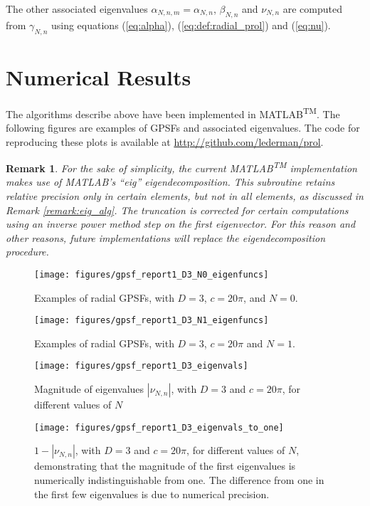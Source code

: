 \documentclass[12pt]{article}
\newtheorem{remark}{Remark}
\begin{document}
The other associated eigenvalues  $\alpha_{N,n,m} = \alpha_{N,n}$, $\beta_{N,n}$ and 
$\nu_{N,n}$ are computed from $\gamma_{N,n}$ using equations (\ref{eq:alpha}), (\ref{eq:def:radial_prol}) and (\ref{eq:nu}).


\section{Numerical Results}\label{sec:results}

The algorithms describe above have been implemented in MATLAB\textsuperscript{TM}.
The following figures are examples of GPSFs and associated eigenvalues. 
The code for reproducing these plots is available at \url{http://github.com/lederman/prol}.

\begin{remark}
For the sake of simplicity, the current MATLAB\textsuperscript{TM} implementation makes use of MATLAB's ``eig'' eigendecomposition.
This subroutine retains relative precision only in certain elements, but not in all elements, as discussed in Remark \ref{remark:eig_alg}.
The truncation is corrected for certain computations using an inverse power method step on the first eigenvector. 
For this reason and other reasons, future implementations will replace the eigendecomposition procedure. 
\end{remark}


\begin{figure}[h]
\texttt{[image: figures/gpsf\_report1\_D3\_N0\_eigenfuncs]}
\caption{Examples of radial GPSFs, with $D=3$, $c=20\pi$, and $N=0$.  }
\end{figure}


\begin{figure}[h]
\texttt{[image: figures/gpsf\_report1\_D3\_N1\_eigenfuncs]}
\caption{Examples of radial GPSFs, with $D=3$, $c=20\pi$ and $N=1$.  }
\end{figure}


\begin{figure}[h]
\texttt{[image: figures/gpsf\_report1\_D3\_eigenvals]}
\caption{Magnitude of eigenvalues $|\nu_{N,n}|$, with $D=3$ and $c=20\pi$, for different values of $N$  }
\end{figure}

\begin{figure}[h]
\texttt{[image: figures/gpsf\_report1\_D3\_eigenvals\_to\_one]}
\caption{$1-|\nu_{N,n}|$, with $D=3$ and $c=20\pi$, for different values of $N$, demonstrating that the magnitude of the first eigenvalues is numerically indistinguishable from one. The difference from one in the first few eigenvalues is due to numerical precision.  }
\end{figure}
\end{document}
